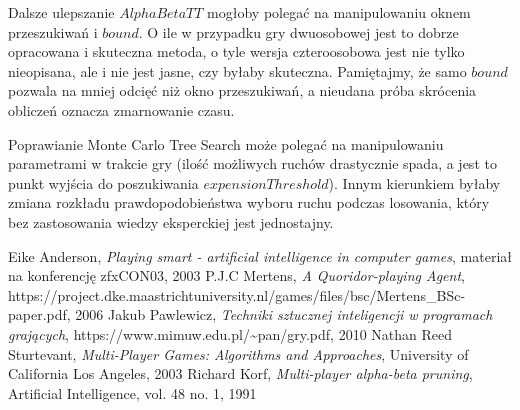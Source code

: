 \documentclass{pracamgr}
\begin{document}
Dalsze ulepszanie \(AlphaBetaTT\) mogłoby polegać na manipulowaniu oknem przeszukiwań i \(bound\).
O ile w przypadku gry dwuosobowej jest to dobrze opracowana i skuteczna metoda, o tyle wersja czteroosobowa jest nie tylko nieopisana, ale i nie jest jasne, czy byłaby skuteczna.
Pamiętajmy, że samo \(bound\) pozwala na mniej odcięć niż okno przeszukiwań, a nieudana próba skrócenia obliczeń oznacza zmarnowanie czasu.

Poprawianie Monte Carlo Tree Search może polegać na manipulowaniu parametrami w trakcie gry (ilość możliwych ruchów drastycznie spada, a jest to punkt wyjścia do poszukiwania \(expensionThreshold\)).
Innym kierunkiem byłaby zmiana rozkładu prawdopodobieństwa wyboru ruchu podczas losowania, który bez zastosowania wiedzy eksperckiej jest jednostajny.

\begin{thebibliography}{98}

 Eike Anderson, \textit{Playing smart - artificial intelligence in computer games}, materiał na konferencję zfxCON03, 2003
 P.J.C Mertens, \textit{A Quoridor-playing Agent},\\https://project.dke.maastrichtuniversity.nl/games/files/bsc/Mertens\_BSc-paper.pdf, 2006
 Jakub Pawlewicz, \textit{Techniki sztucznej inteligencji
    w programach grających}, https://www.mimuw.edu.pl/\textasciitilde{}pan/gry.pdf, 2010
 Nathan Reed Sturtevant, \textit{Multi-Player Games: Algorithms and Approaches}, University of California Los Angeles, 2003
 Richard Korf, \textit{Multi-player alpha-beta pruning}, Artificial Intelligence, vol. 48 no. 1, 1991

\end{thebibliography}
\end{document}
